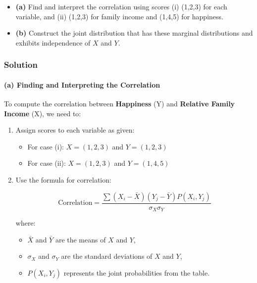 \documentclass[
]{article}
\providecommand{\tightlist}{%
  \setlength{\itemsep}{0pt}\setlength{\parskip}{0pt}}
\begin{document}
\begin{itemize}
\tightlist
\item
  \textbf{(a)} Find and interpret the correlation using scores (i)
  (1,2,3) for each variable, and (ii) (1,2,3) for family income and
  (1,4,5) for happiness.
\item
  \textbf{(b)} Construct the joint distribution that has these marginal
  distributions and exhibits independence of \(X\) and \(Y\).
\end{itemize}

\hypertarget{solution-3}{%
\subsubsection{Solution}\label{solution-3}}

\hypertarget{a-finding-and-interpreting-the-correlation}{%
\paragraph{(a) Finding and Interpreting the
Correlation}\label{a-finding-and-interpreting-the-correlation}}

To compute the correlation between \textbf{Happiness} (Y) and
\textbf{Relative Family Income} (X), we need to:

\begin{enumerate}
\def\labelenumi{\arabic{enumi}.}
\item
  Assign scores to each variable as given:

  \begin{itemize}
  \tightlist
  \item
    For case (i): \(X = (1, 2, 3)\) and \(Y = (1, 2, 3)\)
  \item
    For case (ii): \(X = (1, 2, 3)\) and \(Y = (1, 4, 5)\)
  \end{itemize}
\item
  Use the formula for correlation:

  \[
  \text{Correlation} = \frac{\sum (X_i - \bar{X})(Y_j - \bar{Y})P(X_i, Y_j)}{\sigma_X \sigma_Y}
  \]

  where:

  \begin{itemize}
  \tightlist
  \item
    \(\bar{X}\) and \(\bar{Y}\) are the means of \(X\) and \(Y\),
  \item
    \(\sigma_X\) and \(\sigma_Y\) are the standard deviations of \(X\)
    and \(Y\),
  \item
    \(P(X_i, Y_j)\) represents the joint probabilities from the table.
  \end{itemize}
\end{enumerate}
\end{document}
